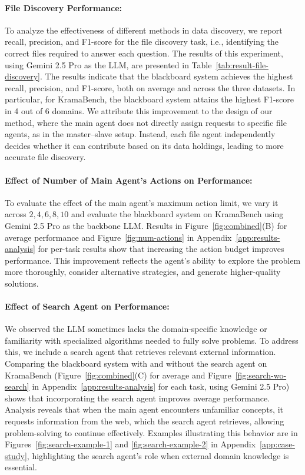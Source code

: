 \paragraph{File Discovery Performance:}

To analyze the effectiveness of different methods in data discovery, we report recall, precision, and F1-score for the file discovery task, i.e., identifying the correct files required to answer each question. The results of this experiment, using Gemini 2.5 Pro as the LLM, are presented in Table~\ref{tab:result-file-discovery}. The results indicate that the blackboard system achieves the highest recall, precision, and F1-score, both on average and across the three datasets. In particular, for KramaBench, the blackboard system attains the highest F1-score in 4 out of 6 domains. We attribute this improvement to the design of our method, where the main agent does not directly assign requests to specific file agents, as in the master–slave setup. Instead, each file agent independently decides whether it can contribute based on its data holdings, leading to more accurate file discovery.




\paragraph{Effect of Number of Main Agent's Actions on Performance:}

To evaluate the effect of the main agent’s maximum action limit, we vary it across ${2, 4, 6, 8, 10}$ and evaluate the blackboard system on KramaBench using Gemini 2.5 Pro as the backbone LLM. Results in Figure~\ref{fig:combined}(B) for average performance and Figure~\ref{fig:num-actions} in Appendix~\ref{app:results-analysis} for per-task results show that increasing the action budget improves performance. This improvement reflects the agent’s ability to explore the problem more thoroughly, consider alternative strategies, and generate higher-quality solutions.

\paragraph{Effect of Search Agent on Performance:}

We observed the LLM sometimes lacks the domain-specific knowledge or familiarity with specialized algorithms needed to fully solve problems. To address this, we include a search agent that retrieves relevant external information. Comparing the blackboard system with and without the search agent on KramaBench (Figure~\ref{fig:combined}(C) for average and Figure~\ref{fig:search-wo-search} in Appendix~\ref{app:results-analysis} for each task, using Gemini 2.5 Pro) shows that incorporating the search agent improves average performance. Analysis reveals that when the main agent encounters unfamiliar concepts, it requests information from the web, which the search agent retrieves, allowing problem-solving to continue effectively. Examples illustrating this behavior are in Figures~\ref{fig:search-example-1} and \ref{fig:search-example-2} in Appendix~\ref{app:case-study}, highlighting the search agent’s role when external domain knowledge is essential.

